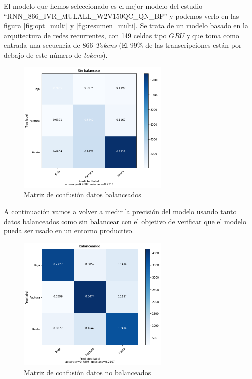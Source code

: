 El modelo que hemos seleccionado es el mejor modelo del estudio ``RNN\_866\_IVR\_MULALL\_W2V150QC\_QN\_BF'' y podemos verlo en las figura \ref{fig:opt_multi} y \ref{fig:resumen_multi}. Se trata de un modelo basado en la arquitectura de redes recurrentes, con 149 celdas tipo $GRU$ y que toma como entrada una secuencia de 866 \textit{Tokens} (El 99\% de las transcripciones están por debajo de este número de \textit{tokens}).


\begin{figure}[!ht]
	\centering
	\includegraphics[width=0.65\textwidth]{images/super/mvp_mat1}
	\caption{Matriz de confusión datos balanceados}
	\label{fig:mvp_mat1}
\end{figure}


A continuación vamos a volver a medir la precisión del modelo usando tanto datos balanceados como sin balancear con el objetivo de verificar que el modelo pueda ser usado en un entorno productivo.




\begin{figure}[!ht]
	\centering
	\includegraphics[width=0.65\textwidth]{images/super/mvp_mat2}
	\caption{Matriz de confusión datos no balanceados}
	\label{fig:mvp_mat2}
\end{figure}

